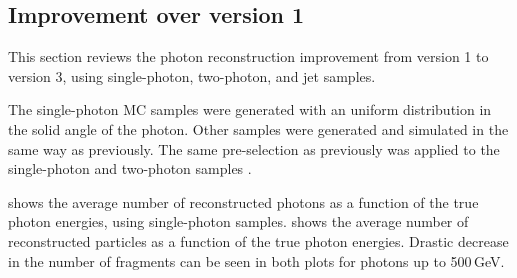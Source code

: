 \subsection{Improvement over \pandora version 1}
\label{sec:photonPerformanceCompare}

This section reviews the photon reconstruction improvement  from \pandora version 1 to version 3, using single-photon, two-photon, and jet samples.



The single-photon MC  samples were generated with an uniform distribution in the solid angle of the photon. Other samples were generated and simulated in the same way as previously. The same pre-selection as previously was applied to the  single-photon and  two-photon samples .

 shows the average number of reconstructed photons as a function of the true photon energies, using single-photon samples.  shows the average number of reconstructed particles as a function of the true photon energies. Drastic decrease in the number of fragments can be seen in both plots for photons up to 500\,GeV.


